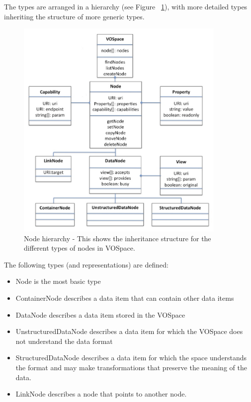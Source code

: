 \documentclass[11pt,a4paper]{ivoa}
\begin{document}
The types are arranged in a hierarchy (see Figure ~\ref{fig:nodehierarchy}), with more detailed types inheriting the structure of more generic types.

\begin{figure}
\centering
\includegraphics[width=0.9\textwidth]{vospace-node-hierarchy.png}
\caption{Node hierarchy - This shows the inheritance structure for the different types of nodes in VOSpace.}
\label{fig:nodehierarchy}
\end{figure}

The following types (and representations) are defined:

\begin{itemize}
    \item Node is the most basic type
    \item ContainerNode describes a data item that can contain other data items
    \item DataNode describes a data item stored in the VOSpace
    \item UnstructuredDataNode describes a data item for which the VOSpace does not understand the data format
    \item StructuredDataNode describes a data item for which the space understands the format and may make transformations that preserve the meaning of the data.
    \item LinkNode describes a node that points to another node.
\end{itemize}
\end{document}
